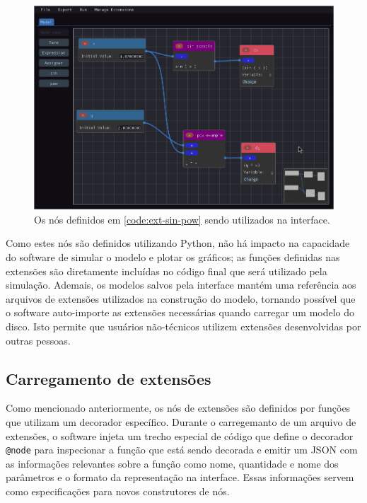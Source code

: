 \documentclass[
	12pt,				%
	openright,			%
	oneside,			%
	a4paper,			%
	main=brazil,
	english,			%
	]{ufsj-abntex2}
\begin{document}
\begin{figure}[h]
    \centering
    \includegraphics[scale=0.45]{imgs/ode-designer/ext-sin-pow.png} 
    \caption{Os nós definidos em \ref{code:ext-sin-pow} sendo utilizados na interface.}
    \label{fig:ext-sin-pow}
\end{figure}

Como estes nós são definidos utilizando Python, não há impacto na capacidade do software de simular o modelo e plotar os gráficos; as funções definidas nas extensões são diretamente incluídas no código final que será utilizado pela simulação. Ademais, os modelos salvos pela interface mantém uma referência aos arquivos de extensões utilizados na construção do modelo, tornando possível que o software auto-importe as extensões necessárias quando carregar um modelo do disco. Isto permite que usuários não-técnicos utilizem extensões desenvolvidas por outras pessoas.

\subsection{Carregamento de extensões}

Como mencionado anteriormente, os nós de extensões são definidos por funções que utilizam um decorador específico. Durante o carregemanto de um arquivo de extensões, o software injeta um trecho especial de código que define o decorador \texttt{@node} para inspecionar a função que está sendo decorada e emitir um JSON com as informações relevantes sobre a função como nome, quantidade e nome dos parâmetros e o formato da representação na interface. Essas informações servem como especificações para novos construtores de nós.
\end{document}
